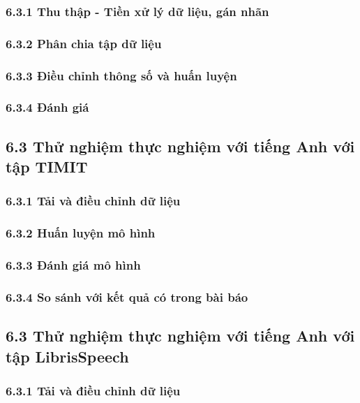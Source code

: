 \documentclass{article}
\begin{document}
	\subsubsection{6.3.1 Thu thập - Tiền xử lý dữ liệu, gán nhãn}
	
	\subsubsection{6.3.2 Phân chia tập dữ liệu}
	
	\subsubsection{6.3.3 Điều chỉnh thông số và huấn luyện}
	
	\subsubsection{6.3.4 Đánh giá}
	
	\subsection{6.3 Thử nghiệm thực nghiệm với tiếng Anh với tập TIMIT}
	\subsubsection{6.3.1 Tải và điều chỉnh dữ liệu}
	
	\subsubsection{6.3.2 Huấn luyện mô hình}
	
	\subsubsection{6.3.3 Đánh giá mô hình}
	
	\subsubsection{6.3.4 So sánh với kết quả có trong bài báo}
	
	\subsection{6.3 Thử nghiệm thực nghiệm với tiếng Anh với tập LibrisSpeech}
	\subsubsection{6.3.1 Tải và điều chỉnh dữ liệu}
	
\end{document}
